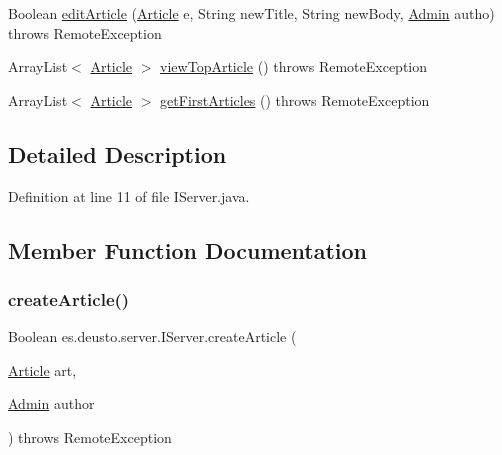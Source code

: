 \begin{DoxyCompactItemize}
\item 
Boolean \hyperlink{interfacees_1_1deusto_1_1server_1_1_i_server_ab5c4258f62146d90a064604891cedf2f}{edit\+Article} (\hyperlink{classes_1_1deusto_1_1server_1_1jdo_1_1_article}{Article} e, String new\+Title, String new\+Body, \hyperlink{classes_1_1deusto_1_1server_1_1jdo_1_1_admin}{Admin} autho)  throws Remote\+Exception
\item 
Array\+List$<$ \hyperlink{classes_1_1deusto_1_1server_1_1jdo_1_1_article}{Article} $>$ \hyperlink{interfacees_1_1deusto_1_1server_1_1_i_server_ab1b33472017b55ae84bf849430db5f1b}{view\+Top\+Article} ()  throws Remote\+Exception
\item 
Array\+List$<$ \hyperlink{classes_1_1deusto_1_1server_1_1jdo_1_1_article}{Article} $>$ \hyperlink{interfacees_1_1deusto_1_1server_1_1_i_server_a27b2a5526387404d63d7fc6d0415acd4}{get\+First\+Articles} ()  throws Remote\+Exception
\end{DoxyCompactItemize}


\subsection{Detailed Description}


Definition at line 11 of file I\+Server.\+java.



\subsection{Member Function Documentation}
\mbox{\label{interfacees_1_1deusto_1_1server_1_1_i_server_a74b3203c5a8d94e91004df0dc84ca386}} 
\subsubsection{\texorpdfstring{create\+Article()}{createArticle()}}
{\footnotesize\ttfamily Boolean es.\+deusto.\+server.\+I\+Server.\+create\+Article (\begin{DoxyParamCaption}\item[{\hyperlink{classes_1_1deusto_1_1server_1_1jdo_1_1_article}{Article}}]{art,  }\item[{\hyperlink{classes_1_1deusto_1_1server_1_1jdo_1_1_admin}{Admin}}]{author }\end{DoxyParamCaption}) throws Remote\+Exception}



